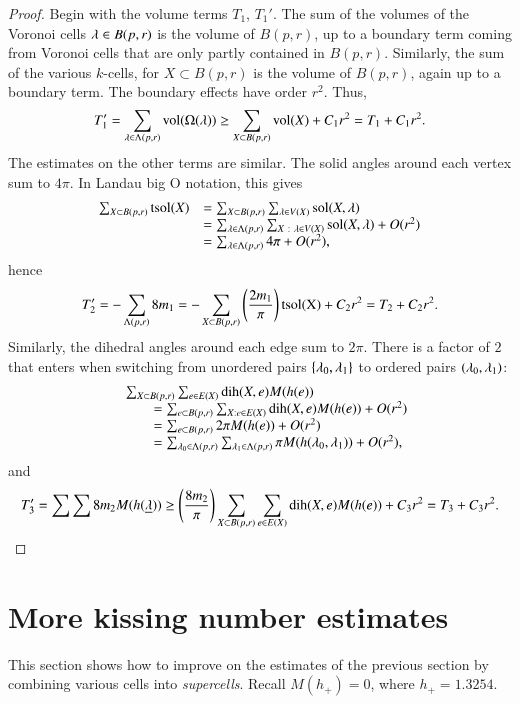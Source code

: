 \begin{proof}
Begin with the volume terms $T_1$, $T_1'$.  The sum of the volumes of the Voronoi cells $\lambda\in B(p,r)$ is the volume of $B(p,r)$, up to a boundary term coming from Voronoi cells that are only partly contained in $B(p,r)$.  Similarly, the sum of the various $k$-cells, for $X\subset B(p,r)$ is the volume of $B(p,r)$, again up to a boundary term. The boundary effects have order $r^2$. Thus,
$$
T_1'= \sum_{\lambda\in \Lambda(p,r)} {\operatorname{vol}}(\Omega(\lambda)) \ge \sum_{X\subset B(p,r)} {\operatorname{vol}}(X) + C_1 r^2 = T_1 + C_1 r^2.
$$
The estimates on the other terms are similar.  The solid angles
around each vertex sum to $4\pi$.
In Landau big O notation, this gives
$$
\begin{array}{lll}
\sum_{X\subset B(p,r)} {\operatorname{tsol}}(X) &= 
\sum_{X\subset B(p,r)} \sum_{\lambda\in V(X)} \operatorname{sol}(X,\lambda)\\
 &=\sum_{\lambda\in \Lambda(p,r)} \sum_{X\ :\  \lambda\in V(X)} \operatorname{sol}(X,\lambda) + O(r^2)\\
 &=\sum_{\lambda\in \Lambda(p,r)} 4\pi    + O(r^2),
\end{array}
$$
hence
$$
T_2' = -\sum_{\Lambda(p,r)} 8 m_1 = -\sum_{X\subset B(p,r)}\left(\frac{2m_1}\pi\right) {\operatorname{tsol(X)}} + C_2 r^2 = T_2 + C_2 r^2.
$$
Similarly, the dihedral angles around each edge sum to $2\pi$.  There is a factor of $2$ that enters when switching from unordered pairs $\{\lambda_0,\lambda_1\}$ to ordered pairs $(\lambda_0,\lambda_1)$:
$$
\begin{array}{lll}
&\sum_{X\subset B(p,r)} \sum_{e\in E(X)} \operatorname{dih}(X,e)  M(h(e)) \\
&\qquad=\sum_{e\subset B(p,r)} \sum_{X: e\in E(X)} \operatorname{dih}(X,e)  M(h(e)) +O(r^2)\\
 &\qquad=\sum_{e\subset B(p,r)} 2\pi M(h(e)) + O(r^2) \\
 &\qquad=\sum_{\lambda_0\in \Lambda(p,r)} \sum_{\lambda_1\in \Lambda(p,r) } \pi M(h(\lambda_0,\lambda_1)) + O(r^2),\\
\end{array}
$$
and 
$$
T_3' = \sum\sum 8 m_2 M(h({\underline{\lambda}})) \ge \left(\frac{8m_2}\pi\right)
\sum_{X\subset B(p,r)}\sum_{e\in E(X)}\operatorname{dih}(X,e) M(h(e)) + C_3 r^2 = T_3 + C_3 r^2.
$$
\end{proof}




\section{More kissing number estimates}

This section shows how to improve on the estimates of the previous section
by combining various cells into {\it supercells}.
Recall $M(h_+) = 0$, where   $h_+ = 1.3254$.


